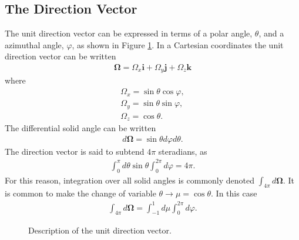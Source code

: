 \documentclass[11pt]{article}
\renewcommand\vec{\mathbf}
\begin{document}
\subsection{The Direction Vector}
\label{sec:orgheadline66}
The unit direction vector can be expressed in terms of a polar angle, \(\theta\), and a azimuthal angle, \(\varphi\), as shown in Figure \ref{fig::unitDirection}.  In a Cartesian coordinates the unit direction vector can be written
\begin{align}
  \vec{\Omega} = \Omega_x \vec{i} + \Omega_y \vec{j} + \Omega_z \vec{k}
\end{align} 
where
\begin{subequations}
\begin{align}
  \Omega_x = \sin\theta \cos\varphi, \\
  \Omega_y = \sin\theta \sin\varphi, \\
  \Omega_z = \cos\theta.
\end{align}
\end{subequations}
The differential solid angle can be written
\begin{align}
  d\vec{\Omega} = \sin\theta d\varphi d\theta.
\end{align}
The direction vector is said to subtend \(4\pi\) steradians, as
\begin{align}
  \int_0^\pi d\theta \sin\theta \int_0^{2\pi} d\varphi = 4\pi.
\end{align}
For this reason, integration over all solid angles is commonly denoted \(\int_{4\pi} d\vec{\Omega}\).
It is common to make the change of variable \(\theta \rightarrow \mu = \cos\theta\).  In this case
\begin{align}
  \int_{4\pi} d\vec{\Omega} = \int_{-1}^1 d\mu \int_0^{2\pi} d\varphi.
\end{align}

\begin{figure}
\centering
{}
\caption{Description of the unit direction vector.}
\label{fig::unitDirection}
\end{figure}
\end{document}
